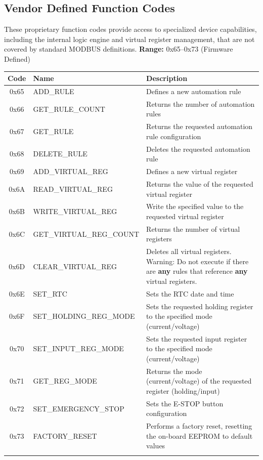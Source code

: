 \documentclass[10pt]{datasheet}
\begin{document}
\subsection{Vendor Defined Function Codes}
These proprietary function codes provide access to specialized device capabilities, including the internal logic engine and virtual register management, that are not covered by standard MODBUS definitions.
\textbf{Range:} 0x65--0x73 (Firmware Defined)
\begin{table}[H]
\begin{tabularx}{\textwidth}{c | l | X}
    \thickhline
    \textbf{Code} & \textbf{Name} & \textbf{Description} \\
    \hline
    0x65 & ADD\_RULE & Defines a new automation rule \\
    0x66 & GET\_RULE\_COUNT & Returns the number of automation rules \\
    0x67 & GET\_RULE & Returns the requested automation rule configuration \\
    0x68 & DELETE\_RULE & Deletes the requested automation rule \\
    0x69 & ADD\_VIRTUAL\_REG & Defines a new virtual register \\
    0x6A & READ\_VIRTUAL\_REG & Returns the value of the requested virtual register \\
    0x6B & WRITE\_VIRTUAL\_REG & Write the specified value to the requested virtual register \\
    0x6C & GET\_VIRTUAL\_REG\_COUNT & Returns the number of virtual registers \\
    0x6D & CLEAR\_VIRTUAL\_REG & Deletes all virtual registers. Warning: Do not execute if there are \textbf{any} rules that reference \textbf{any} virtual registers. \\
    0x6E & SET\_RTC & Sets the RTC date and time \\
    0x6F & SET\_HOLDING\_REG\_MODE & Sets the requested holding register to the specified mode (current/voltage) \\
    0x70 & SET\_INPUT\_REG\_MODE & Sets the requested input register to the specified mode (current/voltage) \\
    0x71 & GET\_REG\_MODE & Returns the mode (current/voltage) of the requested register (holding/input) \\
    0x72 & SET\_EMERGENCY\_STOP & Sets the E-STOP button configuration \\
    0x73 & FACTORY\_RESET & Performs a factory reset, resetting the on-board EEPROM to default values \\
    \thickhline
\end{tabularx}
\end{table}
\end{document}
